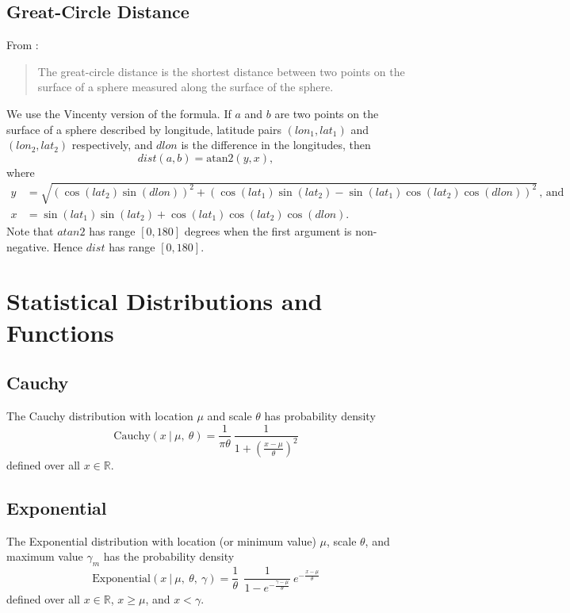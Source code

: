 \documentclass[12pt,letterpaper,onecolumn,oneside]{article}
\begin{document}
\begin{appendices}
\subsection{Great-Circle Distance}

From \cite{wiki-great-circle-dist}:
\begin{quote} 
The great-circle distance is the shortest distance between two points on
the surface of a sphere measured along the surface of the sphere.
\end{quote}
We use the Vincenty version of the formula. If $a$ and $b$
are two points on the surface of a sphere described by longitude,
latitude pairs $(lon_1, lat_1)$ and $(lon_2, lat_2)$ respectively, and
$dlon$ is the difference in the longitudes, then
\[dist(a,b) = \text{atan2} (y, x), \]
where
\begin{align*}
y &= \sqrt{(\cos(lat_2) \sin(dlon))^2 
+ (\cos(lat_1) \sin(lat_2) - \sin(lat_1)\cos(lat_2)\cos(dlon))^2} \, 
, \, \text{and}\\
x &= {\sin(lat_1) \sin(lat_2) + \cos(lat_1) \cos(lat_2) \cos(dlon)}.
\end{align*}
Note that $atan2$ \citep{wiki-atan2} has range $[0, 180]$ degrees when the
first argument is non-negative. Hence $dist$ has range $[0, 180]$.

\section{Statistical Distributions and Functions} 

\subsection{Cauchy}

The Cauchy distribution with location $\mu$ and scale
$\theta$ has probability density
\[ \text{Cauchy}(x \ | \ \mu, \ \theta) = 
\frac{1}{\pi \theta} \ \frac{1}{ 1 + (\frac{x - \mu}{\theta})^2 }
\]
defined over all $x \in \mathbb{R}$.

\subsection{Exponential}

The Exponential distribution with location (or minimum value) $\mu$,
scale $\theta$, and maximum value $\gamma_m$ has the probability density
\[ \text{Exponential}(x \ | \ \mu, \ \theta, \ \gamma) =
\frac{1}{\theta} \
\ \frac{1}{1 - e^{-\frac{\gamma-\mu}{\theta}}} \ 
e^{-\frac{ x - \mu} {\theta}} \]
defined over all $x \in \mathbb{R}$, $x \ge \mu$, and $x < \gamma$.


\end{appendices}
\end{document}
